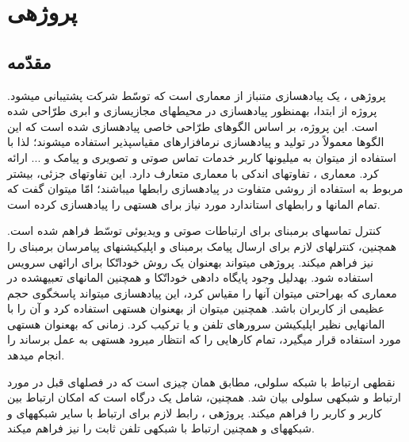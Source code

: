\chapter{پروژه\nf ی }
\label{cwpart}
\section{مقدّمه}

پروژه\nf ی \cite{webcw}، یک پیاده\nf سازی متن\nf باز از معماری  است که توسّط شرکت \cite{metaswitch} پشتیبانی می\nf شود. پروژه  از ابتدا، به\nf منظور پیاده\nf سازی در محیط\nf های مجازی\nf سازی و ابری طرّاحی شده است. این پروژه، بر اساس الگوهای طرّاحی خاصی پیاده\nf سازی شده است که این الگوها معمولاً در تولید و پیاده\nf سازی نرم\nf افزارهای مقیاس\nf پذیر استفاده می\nf شوند؛ لذا با استفاده از  می\nf توان به میلیون\nf ها کاربر خدمات تماس صوتی و تصویری و پیامک و ... ارائه کرد. معماری ، تفاوت\nf های اندکی با معماری متعارف  دارد. این تفاوت\nf های جزئی،‌ بیشتر مربوط به استفاده از روشی متفاوت در پیاده\nf سازی رابط\nf ها می\nf باشند؛ امّا می\nf توان گفت که  تمام المان\nf ها و رابط\nf های استاندارد مورد نیاز برای هسته\nf ی  را پیاده\nf سازی کرده است. 

کنترل تماس\nf های برمبنای  برای ارتباطات صوتی و ویدیوئی توسّط  فراهم شده است. همچنین،  کنترل\nf های لازم برای ارسال پیامک برمبنای  و اپلیکیشن\nf های پیام\nf رسان برمبنای  را نیز فراهم می\nf کند. پروژه\nf ی  می\nf تواند به\nf عنوان یک روش خوداتّکا برای ارائه\nf ی سرویس  استفاده شود. به\nf دلیل وجود پایگاه داده\nf ی خوداتّکا و همچنین المان\nf های تعبیه\nf شده در معماری  که به\nf راحتی می\nf توان آنها را مقیاس کرد، این پیاده\nf سازی می\nf تواند پاسخگوی حجم عظیمی از کاربران  باشد. همچنین می\nf توان از  به\nf عنوان هسته\nf ی  استفاده کرد و آن را با المان\nf هایی نظیر اپلیکیشن سرورهای تلفن و یا  ترکیب کرد. زمانی که  به\nf عنوان هسته\nf ی مورد استفاده قرار می\nf گیرد، تمام کارهایی را که انتظار می\nf رود هسته\nf ی  به عمل برساند را انجام می\nf دهد.

نقطه\nf ی ارتباط  با شبکه سلولی، مطابق همان چیزی است که در فصل\nf های قبل در مورد ارتباط  و شبکه\nf ی سلولی بیان شد. همچنین،  شامل یک درگاه  است که امکان ارتباط بین کاربر  و کاربر   را فراهم می\nf کند. پروژه\nf ی ، رابط لازم برای ارتباط با سایر شبکه\nf های  و شبکه\nf های  و همچنین ارتباط با شبکه\nf ی تلفن ثابت را نیز فراهم می\nf کند. 


